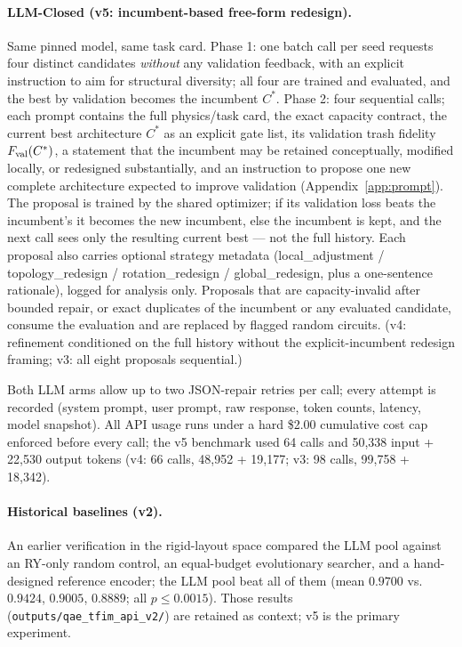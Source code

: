 \documentclass[11pt]{article}
\begin{document}
\paragraph{LLM-Closed (v5: incumbent-based free-form redesign).}
Same pinned model, same task card.
Phase 1: one batch call per seed requests four distinct candidates \emph{without} any validation feedback, with an explicit instruction to aim for structural diversity; all four are trained and evaluated, and the best by validation becomes the incumbent $C^*$.
Phase 2: four sequential calls; each prompt contains the full physics/task card, the exact capacity contract, the current best architecture $C^*$ as an explicit gate list, its validation trash fidelity $F_{\rm val}(C^*)$, a statement that the incumbent may be retained conceptually, modified locally, or redesigned substantially, and an instruction to propose one new complete architecture expected to improve validation (Appendix~\ref{app:prompt}).
The proposal is trained by the shared optimizer; if its validation loss beats the incumbent's it becomes the new incumbent, else the incumbent is kept, and the next call sees only the resulting current best --- not the full history.
Each proposal also carries optional strategy metadata (local\_adjustment / topology\_redesign / rotation\_redesign / global\_redesign, plus a one-sentence rationale), logged for analysis only.
Proposals that are capacity-invalid after bounded repair, or exact duplicates of the incumbent or any evaluated candidate, consume the evaluation and are replaced by flagged random circuits.
(v4: refinement conditioned on the full history without the explicit-incumbent redesign framing; v3: all eight proposals sequential.)

Both LLM arms allow up to two JSON-repair retries per call; every attempt is recorded (system prompt, user prompt, raw response, token counts, latency, model snapshot).
All API usage runs under a hard \$2.00 cumulative cost cap enforced before every call; the v5 benchmark used 64 calls and 50{,}338 input + 22{,}530 output tokens (v4: 66 calls, 48{,}952 + 19{,}177; v3: 98 calls, 99{,}758 + 18{,}342).

\paragraph{Historical baselines (v2).}
An earlier verification in the rigid-layout space compared the LLM pool against an RY-only random control, an equal-budget evolutionary searcher, and a hand-designed reference encoder; the LLM pool beat all of them (mean $0.9700$ vs.\ $0.9424$, $0.9005$, $0.8889$; all $p\le0.0015$).
Those results (\texttt{outputs/qae\_tfim\_api\_v2/}) are retained as context; v5 is the primary experiment.
\end{document}
